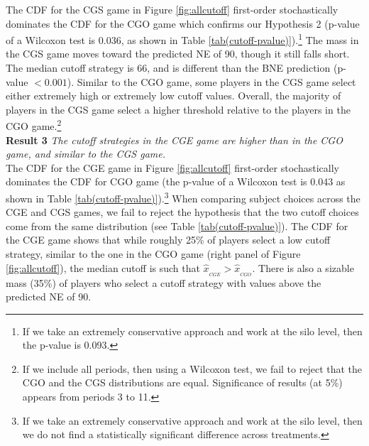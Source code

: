 \documentclass[12pt, letterpaper]{article}
\theoremstyle{plain}
\begin{document}
The CDF for the CGS game in Figure \ref{fig:allcutoff} first-order stochastically dominates the CDF for the CGO game which confirms our Hypothesis 2 (p-value of a Wilcoxon test is 0.036, as shown in Table \ref{tab(cutoff-pvalue)}).\footnote{If we take an extremely conservative approach and work at the silo level, then the p-value is 0.093.} The mass in the CGS game moves toward the predicted NE of 90, though it still falls short. The median cutoff strategy is 66, and is different than the BNE prediction (p-value $< 0.001$).  Similar to the CGO game, some players in the CGS game select either extremely high or extremely low cutoff values. Overall, the majority of players in the CGS game select a higher threshold relative to the players in the CGO game.\footnote{If we include all periods, then using a Wilcoxon test, we fail to reject that the CGO and the CGS distributions are equal. Significance of results (at 5\%) appears from periods 3 to 11.}\\


\noindent \textbf{Result 3}
\textit{The cutoff strategies in the CGE game are higher than in the CGO game, and similar to the CGS game.}\\

The CDF for the CGE game in Figure \ref{fig:allcutoff} first-order stochastically dominates the CDF for CGO game (the p-value of a Wilcoxon test is 0.043 as shown in Table \ref{tab(cutoff-pvalue)}).\footnote{If we take an extremely conservative approach and work at the silo level, then we do not find a statistically significant difference across treatments.} When comparing subject choices across the CGE and CGS games, we fail to reject the hypothesis that the two cutoff choices come from the same distribution (see Table \ref{tab(cutoff-pvalue)}). The CDF for the CGE game shows that while roughly 25\% of players select a low cutoff strategy,  similar to the one in the CGO game (right panel of Figure \ref{fig:allcutoff}), the median cutoff is such that $\hat{x}_{_{CGE}}> \hat{x}_{_{CGO}}$. There is also a sizable mass (35\%) of players who select a cutoff strategy with values above the predicted NE of 90.
\end{document}
